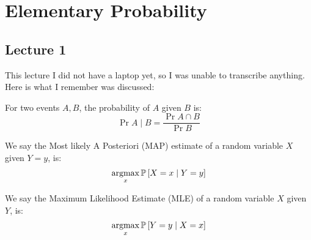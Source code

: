 
\section{Elementary Probability}
\subsection{Lecture 1}

This lecture I did not have a laptop yet, so I was unable to transcribe anything.
Here is what I remember was discussed:

\begin{definition} 
    For two events $A, B$, the probability of $A$ given $B$ is:
    \[ \Pr{A \mid B} = \frac{\Pr{A \cap B}}{\Pr{B}}  \]
\end{definition}

\begin{definition} [MAP]
    We say the Most likely A Posteriori (MAP) estimate of a random variable $X$ given $Y=y$, is:
    \[ \operatorname*{argmax}_x \mathbb{P}\left[ X=x \mid Y=y \right] \]
\end{definition}

\begin{definition} [MLE]
    We say the Maximum Likelihood Estimate (MLE) of a random variable $X$ given $Y$, is:
    \[ \operatorname*{argmax}_x \mathbb{P}\left[ Y=y \mid X=x \right] \]
\end{definition}
\endinput